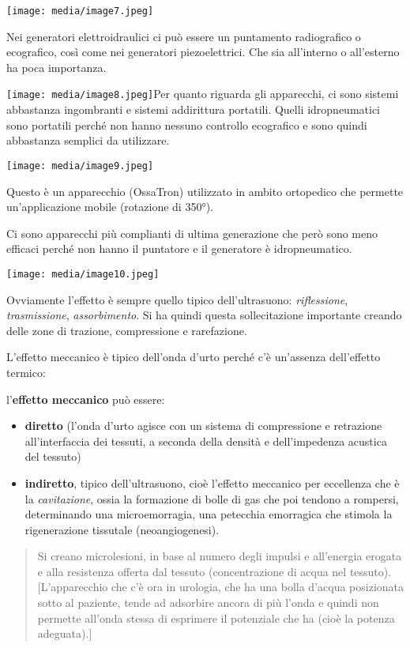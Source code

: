\documentclass[]{article}
\begin{document}
\texttt{[image: media/image7.jpeg]}

Nei generatori elettroidraulici ci può essere un puntamento radiografico
o ecografico, così come nei generatori piezoelettrici. Che sia
all'interno o all'esterno ha poca importanza.

\texttt{[image: media/image8.jpeg]}Per
quanto riguarda gli apparecchi, ci sono sistemi abbastanza ingombranti e
sistemi addirittura portatili. Quelli idropneumatici sono portatili
perché non hanno nessuno controllo ecografico e sono quindi abbastanza
semplici da utilizzare.

\texttt{[image: media/image9.jpeg]}

Questo è un apparecchio (OssaTron) utilizzato in ambito ortopedico che
permette un'applicazione mobile (rotazione di 350°).

Ci sono apparecchi più complianti di ultima generazione che però sono
meno efficaci perché non hanno il puntatore e il generatore è
idropneumatico.

\texttt{[image: media/image10.jpeg]}

Ovviamente l'effetto è sempre quello tipico dell'ultrasuono:
\emph{riflessione}, \emph{trasmissione}, \emph{assorbimento}. Si ha
quindi questa sollecitazione importante creando delle zone di trazione,
compressione e rarefazione.

L'effetto meccanico è tipico dell'onda d'urto perché c'è un'assenza
dell'effetto termico:

l'\textbf{effetto meccanico} può essere:

\begin{itemize}
\item
  \textbf{diretto} (l'onda d'urto agisce con un sistema di compressione
  e retrazione all'interfaccia dei tessuti, a seconda della densità e
  dell'impedenza acustica del tessuto)
\item
  \textbf{indiretto}, tipico dell'ultrasuono, cioè l'effetto meccanico
  per eccellenza che è la \emph{cavitazione}, ossia la formazione di
  bolle di gas che poi tendono a rompersi, determinando una
  microemorragia, una petecchia emorragica che stimola la rigenerazione
  tissutale (neoangiogenesi).
\end{itemize}

\begin{quote}
Si creano microlesioni, in base al numero degli impulsi e all'energia
erogata e alla resistenza offerta dal tessuto (concentrazione di acqua
nel tessuto). {[}L'apparecchio che c'è ora in urologia, che ha una bolla
d'acqua posizionata sotto al paziente, tende ad adsorbire ancora di più
l'onda e quindi non permette all'onda stessa di esprimere il potenziale
che ha (cioè la potenza adeguata).{]}
\end{quote}
\end{document}
